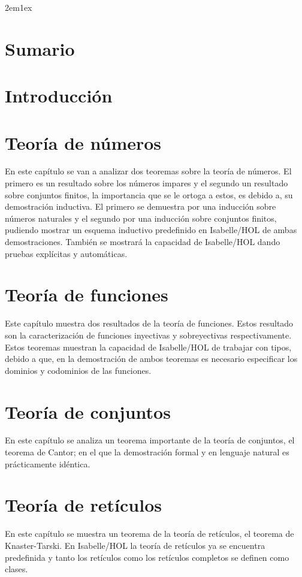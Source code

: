 \documentclass[12pt,a4paper,twoside]{book}
\begin{document}
\newpage

\tableofcontents

\parindent 2em\parskip 1ex

% 
\chapter*{Sumario}

\chapter*{Introducción}

\chapter{Teoría de números}
En este capítulo se van a analizar dos teoremas sobre la teoría de
números. El primero es un resultado sobre los números impares y el
 segundo un resultado sobre conjuntos finitos, la importancia que se le
 ortoga a estos, es debido a, su demostración inductiva. El primero se
 demuestra por una inducción sobre números naturales y el segundo por
 una inducción sobre conjuntos finitos, pudiendo mostrar un esquema
 inductivo predefinido en Isabelle/HOL de ambas demostraciones. También
 se mostrará la capacidad de Isabelle/HOL dando pruebas explícitas y
 automáticas.


\chapter{Teoría de funciones}
Este capítulo muestra dos resultados de la teoría de funciones. Estos
resultado son la caracterización de funciones inyectivas y sobreyectivas 
respectivamente. Estos teoremas muestran la capacidad de Isabelle/HOL de 
trabajar con tipos, debido a que, en la demostración de ambos teoremas 
es necesario especificar los dominios y codominios de las funciones.


\chapter{Teoría de conjuntos}
En este capítulo se analiza un teorema importante de la teoría de conjuntos,
el teorema de Cantor; en el que la demostración formal y en lenguaje natural
es prácticamente idéntica. 

\chapter{Teoría de retículos}
En este capítulo se muestra un teorema de la teoría de retículos, el teorema de
Knaster-Tarski. En Isabelle/HOL la teoría de retículos ya se encuentra predefinida
y tanto los retículos como los retículos completos se definen como clases. 

\end{document}
